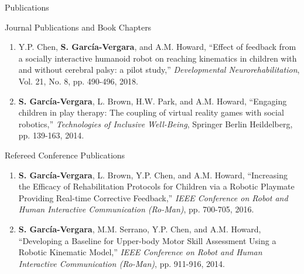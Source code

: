 \documentclass{resume} %
\newcommand{\sectionspace}{\vspace{3mm}}
\newcommand{\Sergio}{\textbf{S. Garc\'{i}a-Vergara}}
\newcommand{\SuperPop}{Super Pop VR\textsuperscript{TM}\space}
\begin{document}
\sectionspace
\begin{rSection}{Publications}

\begin{rSubsection}{Journal Publications and Book Chapters}{}{}{}
\item
\begin{enumerate}

\item Y.P. Chen, \Sergio, and A.M. Howard, ``Effect of feedback from a socially
  interactive humanoid robot on reaching kinematics in children with and without
  cerebral palsy: a pilot study,'' \textit{Developmental Neurorehabilitation},
  Vol. 21, No. 8, pp. 490-496, 2018.


\item \Sergio, L. Brown, H.W. Park, and A.M. Howard, ``Engaging children in play
  therapy: The coupling of virtual reality games with social robotics,''
  \textit{Technologies of Inclusive Well-Being}, Springer Berlin Heildelberg,
  pp. 139-163, 2014.
\end{enumerate}
\end{rSubsection}



\sectionspace

\begin{rSubsection}{Refereed Conference Publications}{}{}{}
\item
\begin{enumerate}

\item \Sergio, L. Brown, Y.P. Chen, and A.M. Howard, ``Increasing the Efficacy
  of Rehabilitation Protocols for Children via a Robotic Playmate Providing
  Real-time Corrective Feedback,'' \textit{IEEE Conference on Robot and Human
    Interactive Communication (Ro-Man)}, pp. 700-705, 2016.

\item \Sergio, M.M. Serrano, Y.P. Chen, and A.M. Howard, ``Developing a Baseline
  for Upper-body Motor Skill Assessment Using a Robotic Kinematic Model,''
  \textit{IEEE Conference on Robot and Human Interactive Communication
    (Ro-Man)}, pp. 911-916, 2014.


\end{enumerate}
\end{rSubsection}
\end{rSection}
\end{document}
